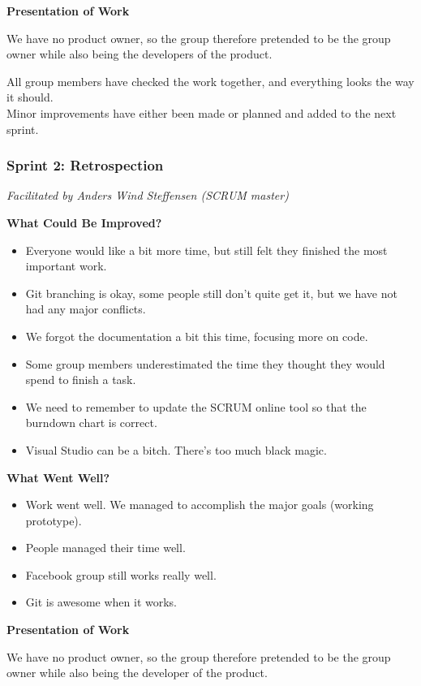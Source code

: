 {\textbf{Presentation of Work}

We have no product owner, so the group therefore pretended to be the group owner while also being the developers of the product. 

All group members have checked the work together, and everything looks the way it should. \\
Minor improvements have either been made or planned and added to the next sprint. 


\subsubsection{Sprint 2: Retrospection}
\label{sec:sprint2}
\small{\textit{Facilitated by Anders Wind Steffensen (SCRUM master)}} 

\textbf{What Could Be Improved?}

\begin{itemize}
	\item Everyone would like a bit more time, but still felt they finished the most important work.
	\item Git branching is okay, some people still don't quite get it, but we have not had any major conflicts.
	\item We forgot the documentation a bit this time, focusing more on code. 
	\item Some group members underestimated the time they thought they would spend to finish a task.
	\item We need to remember to update the SCRUM online tool so that the burndown chart is correct.
	\item Visual Studio can be a bitch. There's too much black magic.
\end{itemize}

\textbf{What Went Well?}

\begin{itemize}
	\item Work went well. We managed to accomplish the major goals (working prototype).
	\item People managed their time well.
	\item Facebook group still works really well.
	\item Git is awesome when it works.
\end{itemize}

\textbf{Presentation of Work}

We have no product owner, so the group therefore pretended to be the group owner while also being the developer of the product.

}
